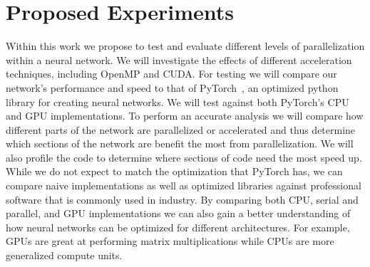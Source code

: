 \documentclass[10pt,twocolumn,letterpaper]{article}
\begin{document}
\section{Proposed Experiments}
%
Within this work we propose to test and evaluate different levels of
parallelization within a neural network. We will investigate the effects of
different acceleration techniques, including OpenMP and CUDA. For testing we
will compare our network's performance and speed to that of
PyTorch~\cite{paszke2017automatic}, an optimized python library for creating
neural networks. We will test against both PyTorch's CPU and GPU
implementations. To perform an accurate analysis we will compare how different
parts of the network are parallelized or accelerated and thus determine which
sections of the network are benefit the most from parallelization. We will also
profile the code to determine where sections of code need the most speed up.
While we do not expect to match the optimization that PyTorch has, we can
compare naive implementations as well as optimized libraries against
professional software that is commonly used in industry. By comparing both CPU,
serial and parallel, and GPU implementations we can also gain a better
understanding of how neural networks can be optimized for different
architectures. For example, GPUs are great at performing matrix multiplications
while CPUs are more generalized compute units. 

%

%
 
%
\end{document}
